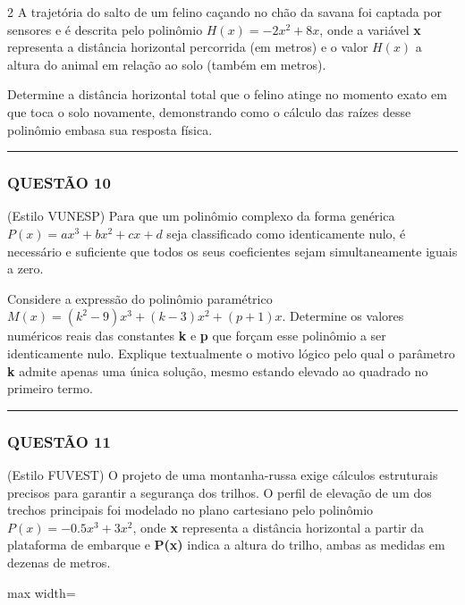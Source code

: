 \documentclass[twoside, 10pt, a4paper]{article}
\begin{document}
\begin{multicols*}{2}
A trajetória do salto de um felino caçando no chão da savana foi captada por sensores e é descrita pelo polinômio $ H(x) = -2x^2 + 8x $, onde a variável \textbf{x} representa a distância horizontal percorrida (em metros) e o valor $ H(x) $ a altura do animal em relação ao solo (também em metros). 

Determine a distância horizontal total que o felino atinge no momento exato em que toca o solo novamente, demonstrando como o cálculo das raízes desse polinômio embasa sua resposta física.

\vspace{0cm} \noindent\textcolor{CorLinha}{\rule{\linewidth}{0.5pt}} \vspace{-0.2cm}
\subsubsection*{QUESTÃO 10}

(Estilo VUNESP) Para que um polinômio complexo da forma genérica $ P(x) = ax^3 + bx^2 + cx + d $ seja classificado como identicamente nulo, é necessário e suficiente que todos os seus coeficientes sejam simultaneamente iguais a zero.

Considere a expressão do polinômio paramétrico $ M(x) = (k^2 - 9)x^3 + (k - 3)x^2 + (p + 1)x $. 
Determine os valores numéricos reais das constantes \textbf{k} e \textbf{p} que forçam esse polinômio a ser identicamente nulo. Explique textualmente o motivo lógico pelo qual o parâmetro \textbf{k} admite apenas uma única solução, mesmo estando elevado ao quadrado no primeiro termo.

\vspace{0cm} \noindent\textcolor{CorLinha}{\rule{\linewidth}{0.5pt}} \vspace{-0.2cm}
\subsubsection*{QUESTÃO 11}

(Estilo FUVEST) O projeto de uma montanha-russa exige cálculos estruturais precisos para garantir a segurança dos trilhos. O perfil de elevação de um dos trechos principais foi modelado no plano cartesiano pelo polinômio $ P(x) = -0.5x^3 + 3x^2 $, onde \textbf{x} representa a distância horizontal a partir da plataforma de embarque e \textbf{P(x)} indica a altura do trilho, ambas as medidas em dezenas de metros.

\begin{center}
\begin{adjustbox}{max width=\linewidth}
\end{adjustbox}
\end{center}
\end{multicols*}
\end{document}
